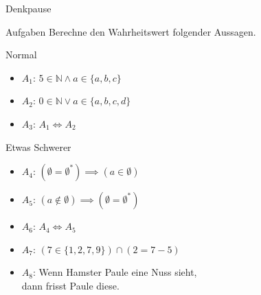 {
\begin{frame}[fragile]{Denkpause}
	\begin{alertblock}{Aufgaben}
		Berechne den Wahrheitswert folgender Aussagen.
	\end{alertblock}
	\begin{block}{Normal}
		\begin{itemize}
			\item $A_1$: $5 \in \mathbb{N} \wedge a \in \{a, b, c\}$
			\item $A_2$: $0 \in \mathbb{N} \vee a \in \{a, b, c, d\}$
			\item $A_3$: $A_1 \iff A_2$
		\end{itemize}
	\end{block}
	\begin{block}{Etwas Schwerer}
		\begin{itemize}
			\item $A_4$: $(\emptyset=\emptyset^{*}) \implies (a \in \emptyset)$
			\item $A_5$: $(a \notin \emptyset) \implies (\emptyset = \emptyset^{*})$
			\item $A_6$: $A_4 \iff A_5$
			\item $A_7$: $(7 \in \{1, 2, 7, 9\}) \cap (2 = 7-5)$
			\item $A_8$: Wenn Hamster Paule eine Nuss sieht,\\
			      \quad dann frisst Paule diese.
		\end{itemize}
	\end{block}
\end{frame}
}


